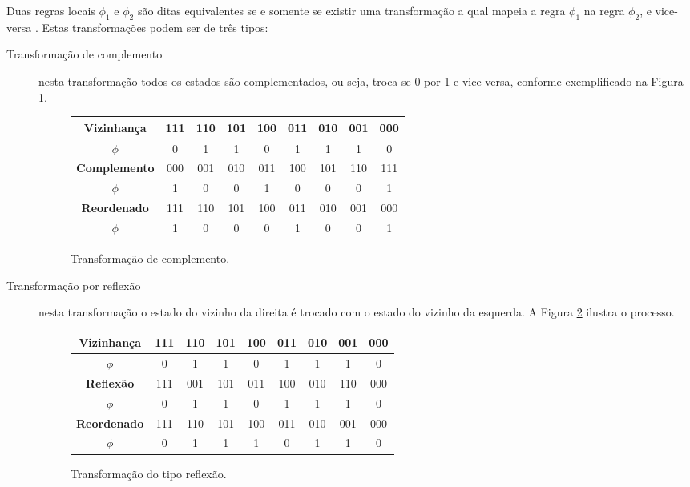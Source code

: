 \documentclass[12pt,a4paper]{article}
\begin{document}
Duas regras locais ${\phi}_1$ e ${\phi}_2$ são ditas equivalentes se e somente se existir
uma transformação a qual mapeia a regra ${\phi}_1$ na regra ${\phi}_2$, e vice-versa
. Estas transformações podem ser de três tipos:

\begin{description}

\item[Transformação de complemento] nesta transformação todos os estados são complementados,
ou seja, troca-se 0 por 1 e vice-versa, conforme exemplificado na Figura \ref{fig:complement}.

\begin{figure}[htp]
\begin{center}
\begin{tabular}{|c|c|c|c|c|c|c|c|c|}
\hline
\Large \textbf{Vizinhança}  & 111 & 110 & 101 & 100 & 011 & 010 & 001 & 000 \\ \hline
\Large \textbf{$\phi$}      &  0  &  1  &  1  &  0  &  1  &  1  &  1  &  0  \\ \hline
\hline
\Large \textbf{Complemento} & 000 & 001 & 010 & 011 & 100 & 101 & 110 & 111 \\ \hline
\Large \textbf{$\phi$}      &  1  &  0  &  0  &  1  &  0  &  0  &  0  &  1  \\ \hline
\hline
\Large \textbf{Reordenado}  & 111 & 110 & 101 & 100 & 011 & 010 & 001 & 000 \\ \hline
\Large \textbf{$\phi$}      &  1  &  0  &  0  &  0  &  1  &  0  &  0  &  1  \\ \hline
\end{tabular}
\caption{Transformação de complemento.}
\label{fig:complement}
\end{center}
\end{figure}

\item[Transformação por reflexão] nesta transformação o estado do vizinho da direita é
trocado com o estado do vizinho da esquerda. A Figura \ref{fig:reflex} ilustra o processo.

\begin{figure}[htp]
\begin{center}
\begin{tabular}{|c|c|c|c|c|c|c|c|c|}
\hline
\Large \textbf{Vizinhança}  & 111 & 110 & 101 & 100 & 011 & 010 & 001 & 000 \\ \hline
\Large \textbf{$\phi$}      &  0  &  1  &  1  &  0  &  1  &  1  &  1  &  0  \\ \hline
\hline
\Large \textbf{Reflexão}    & 111 & 001 & 101 & 011 & 100 & 010 & 110 & 000 \\ \hline
\Large \textbf{$\phi$}      &  0  &  1  &  1  &  0  &  1  &  1  &  1  &  0  \\ \hline
\hline
\Large \textbf{Reordenado}  & 111 & 110 & 101 & 100 & 011 & 010 & 001 & 000 \\ \hline
\Large \textbf{$\phi$}      &  0  &  1  &  1  &  1  &  0  &  1  &  1  &  0  \\ \hline
\end{tabular}
\caption{Transformação do tipo reflexão.}
\label{fig:reflex}
\end{center}
\end{figure}


\end{description}
\end{document}
